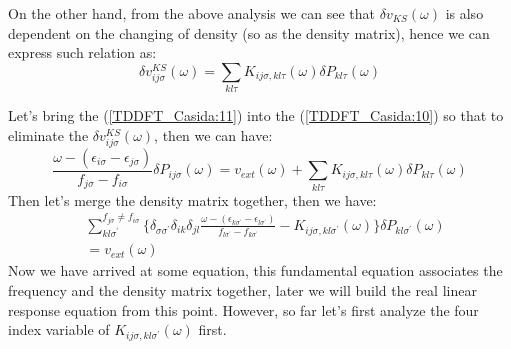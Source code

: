 On the other hand, from the above analysis we can see that $\delta
v_{KS}(\omega)$ is also dependent on the changing of density (so as
the density matrix), hence we can express such relation as:
\begin{equation}
 \label{TDDFT_Casida:11}
\delta v^{KS}_{ij\sigma} (\omega) = \sum_{kl\tau}K_{ij\sigma,
kl\tau}(\omega) \delta P_{kl\tau} (\omega) 
\end{equation}  

Let's bring the (\ref{TDDFT_Casida:11}) into the
(\ref{TDDFT_Casida:10}) so that to eliminate the $\delta
v^{KS}_{ij\sigma} (\omega)$, then we can have:
\begin{equation}
  \frac{\omega - (\epsilon_{i\sigma} -
\epsilon_{j\sigma})}{f_{j\sigma} - f_{i\sigma}}
\delta P_{ij\sigma} (\omega) = v_{ext}(\omega) +
\sum_{kl\tau}K_{ij\sigma,
kl\tau}(\omega) \delta P_{kl\tau} (\omega)
\end{equation} 
Then let's merge the density matrix together, then we have:
\begin{equation}
\begin{split}
\label{TDDFT_Casida:12}
&\sum_{kl\sigma^{'}}^{f_{j\sigma} \neq f_{i\sigma}}  
\Bigg\{
\delta_{\sigma\sigma^{'}}\delta_{ik}\delta_{jl}
\frac{
\omega - (\epsilon_{k\sigma^{'}} - \epsilon_{l\sigma^{'}})}
{f_{l\sigma^{'}} - f_{k\sigma^{'}}}
-
K_{ij\sigma,
kl\sigma^{'}}(\omega)
\Bigg\}
\delta P_{kl\sigma^{'}} (\omega) \\
&= v_{ext}(\omega)
\end{split} 
\end{equation}
Now we have arrived at some equation, this fundamental equation
associates the frequency and the density matrix together, later we
will build the real linear response equation from this point.
However, so far let's first analyze the four index variable of
$K_{ij\sigma, kl\sigma^{'}}(\omega)$ first. 


